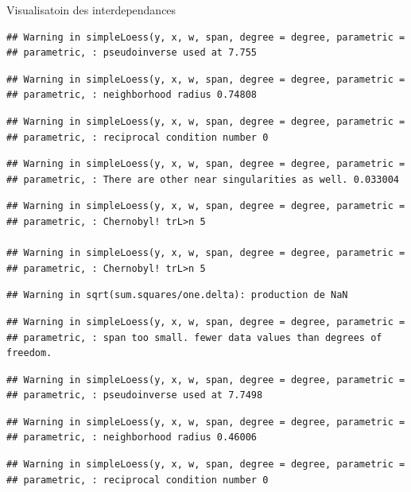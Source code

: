 \documentclass[11pt,ignorenonframetext,]{beamer}
\begin{document}
\begin{frame}[fragile]{Visualisatoin des interdependances}
\begin{verbatim}
## Warning in simpleLoess(y, x, w, span, degree = degree, parametric =
## parametric, : pseudoinverse used at 7.755
\end{verbatim}

\begin{verbatim}
## Warning in simpleLoess(y, x, w, span, degree = degree, parametric =
## parametric, : neighborhood radius 0.74808
\end{verbatim}

\begin{verbatim}
## Warning in simpleLoess(y, x, w, span, degree = degree, parametric =
## parametric, : reciprocal condition number 0
\end{verbatim}

\begin{verbatim}
## Warning in simpleLoess(y, x, w, span, degree = degree, parametric =
## parametric, : There are other near singularities as well. 0.033004
\end{verbatim}

\begin{verbatim}
## Warning in simpleLoess(y, x, w, span, degree = degree, parametric =
## parametric, : Chernobyl! trL>n 5

## Warning in simpleLoess(y, x, w, span, degree = degree, parametric =
## parametric, : Chernobyl! trL>n 5
\end{verbatim}

\begin{verbatim}
## Warning in sqrt(sum.squares/one.delta): production de NaN
\end{verbatim}

\begin{verbatim}
## Warning in simpleLoess(y, x, w, span, degree = degree, parametric =
## parametric, : span too small. fewer data values than degrees of freedom.
\end{verbatim}

\begin{verbatim}
## Warning in simpleLoess(y, x, w, span, degree = degree, parametric =
## parametric, : pseudoinverse used at 7.7498
\end{verbatim}

\begin{verbatim}
## Warning in simpleLoess(y, x, w, span, degree = degree, parametric =
## parametric, : neighborhood radius 0.46006
\end{verbatim}

\begin{verbatim}
## Warning in simpleLoess(y, x, w, span, degree = degree, parametric =
## parametric, : reciprocal condition number 0
\end{verbatim}


\end{frame}
\end{document}
